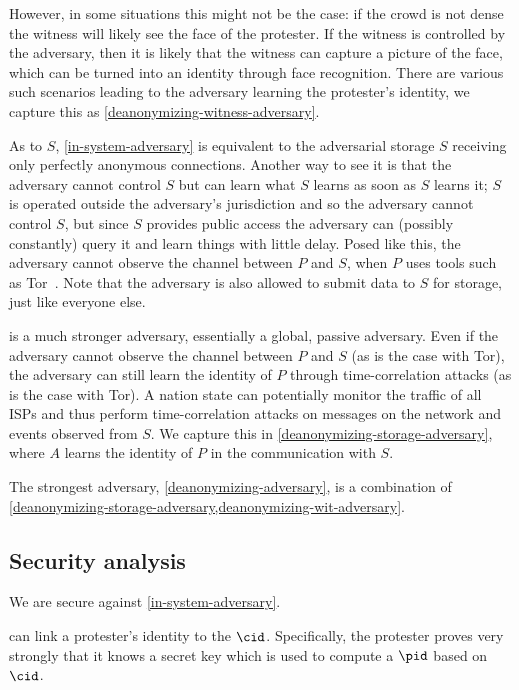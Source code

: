 However, in some situations this might not be the case: \Eg if the crowd is not 
dense the witness will likely see the face of the protester.
If the witness is controlled by the adversary, then it is likely that the 
witness can capture a picture of the face, which can be turned into an identity 
through face recognition.
There are various such scenarios leading to the adversary learning the 
protester's identity, we capture this as 
\cref{deanonymizing-witness-adversary}.

As to \(S\), \cref{in-system-adversary} is equivalent to the adversarial 
storage \(S\) receiving only perfectly anonymous connections.
Another way to see it is that the adversary cannot control \(S\) but can learn 
what \(S\) learns as soon as \(S\) learns it; \eg \(S\) is operated outside the 
adversary's jurisdiction and so the adversary cannot control \(S\), but since 
\(S\) provides public access the adversary can (possibly constantly) query it 
and learn things with little delay.
Posed like this, the adversary cannot observe the channel between \(P\) and 
\(S\), \eg when \(P\) uses tools such as Tor~\cite{Tor}.
Note that the adversary is also allowed to submit data to \(S\) for storage, 
just like everyone else.

 is a much stronger adversary, 
essentially a global, passive adversary.
Even if the adversary cannot observe the channel between \(P\) and \(S\) (as is 
the case with Tor), the adversary can still learn the identity of \(P\) through 
\eg time-correlation attacks (as is the case with Tor).
A nation state can potentially monitor the traffic of all \acp{ISP} and thus 
perform time-correlation attacks on messages on the network and events observed 
from \(S\).
We capture this in \cref{deanonymizing-storage-adversary}, where \(A\) learns 
the identity of \(P\) in the communication with \(S\).

The strongest adversary, \cref{deanonymizing-adversary}, is a combination of 
\cref{deanonymizing-storage-adversary,deanonymizing-wit-adversary}.

\subsection{Security analysis}

We are secure against \cref{in-system-adversary}.

 can link a protester's identity to the 
\(\cid\).
Specifically, the protester proves very strongly that it knows a secret key 
which is used to compute a \(\pid\) based on \(\cid\).

